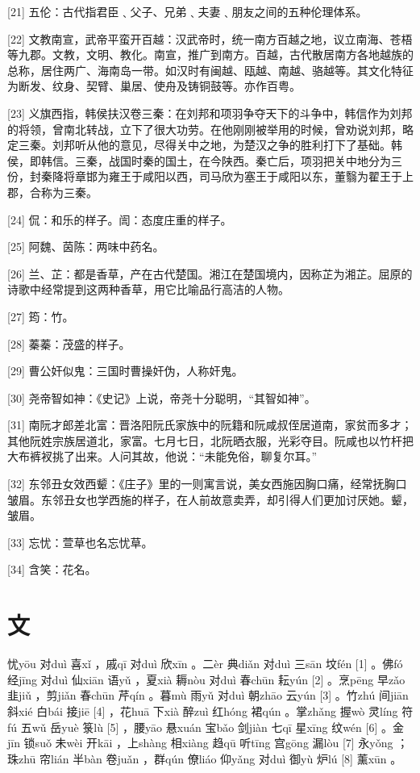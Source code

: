 \documentclass[12pt,UTF8]{ctexbook}
\begin{document}
[21] 五伦：古代指君臣﹑父子、兄弟﹑夫妻﹑朋友之间的五种伦理体系。

[22] 文教南宣，武帝平蛮开百越：汉武帝时，统一南方百越之地，议立南海、苍梧等九郡。文教，文明、教化。南宣，推广到南方。百越，古代散居南方各地越族的总称，居住两广、海南岛一带。如汉时有闽越、瓯越、南越、骆越等。其文化特征为断发、纹身、契臂、巢居、使舟及铸铜鼓等。亦作百粤。

[23] 义旗西指，韩侯扶汉卷三秦：在刘邦和项羽争夺天下的斗争中，韩信作为刘邦的将领，曾南北转战，立下了很大功劳。在他刚刚被举用的时候，曾劝说刘邦，略定三秦。刘邦听从他的意见，尽得关中之地，为楚汉之争的胜利打下了基础。韩侯，即韩信。三秦，战国时秦的国土，在今陕西。秦亡后，项羽把关中地分为三份，封秦降将章邯为雍王于咸阳以西，司马欣为塞王于咸阳以东，董翳为翟王于上郡，合称为三秦。

[24] 侃：和乐的样子。訚：态度庄重的样子。

[25] 阿魏、茵陈：两味中药名。

[26] 兰、芷：都是香草，产在古代楚国。湘江在楚国境内，因称芷为湘芷。屈原的诗歌中经常提到这两种香草，用它比喻品行高洁的人物。

[27] 筠：竹。

[28] 蓁蓁：茂盛的样子。

[29] 曹公奸似鬼：三国时曹操奸伪，人称奸鬼。

[30] 尧帝智如神：《史记》上说，帝尧十分聪明，“其智如神”。

[31] 南阮才郎差北富：晋洛阳阮氏家族中的阮籍和阮咸叔侄居道南，家贫而多才；其他阮姓宗族居道北，家富。七月七日，北阮晒衣服，光彩夺目。阮咸也以竹杆把大布裤衩挑了出来。人问其故，他说：“未能免俗，聊复尔耳。”

[32] 东邻丑女效西颦：《庄子》里的一则寓言说，美女西施因胸口痛，经常抚胸口皱眉。东邻丑女也学西施的样子，在人前故意卖弄，却引得人们更加讨厌她。颦，皱眉。

[33] 忘忧：萱草也名忘忧草。

[34] 含笑：花名。





\chapter{文}


忧yōu 对duì 喜xǐ ，戚qī 对duì 欣xīn 。二èr 典diǎn 对duì 三sān 坟fén [1] 。佛fó 经jīng 对duì 仙xiān 语yǔ ，夏xià 耨nòu 对duì 春chūn 耘yún [2] 。烹pēng 早zǎo 韭jiǔ ，剪jiǎn 春chūn 芹qín 。暮mù 雨yǔ 对duì 朝zhāo 云yún [3] 。竹zhú 间jiān 斜xié 白bái 接jiē [4] ，花huā 下xià 醉zuì 红hóng 裙qún 。掌zhǎng 握wò 灵líng 符fú 五wǔ 岳yuè 箓lù [5] ，腰yāo 悬xuán 宝bǎo 剑jiàn 七qī 星xīng 纹wén [6] 。金jīn 锁suǒ 未wèi 开kāi ，上shàng 相xiàng 趋qū 听tīng 宫gōng 漏lòu [7] 永yǒng ；珠zhū 帘lián 半bàn 卷juǎn ，群qún 僚liáo 仰yǎng 对duì 御yù 炉lú [8] 薰xūn 。
\end{document}

